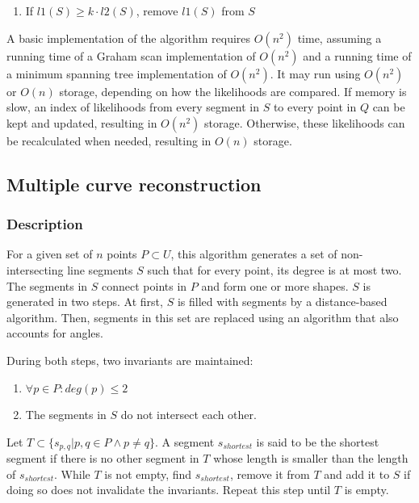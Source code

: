 \documentclass[11pt]{article}
\begin{document}
\begin{enumerate}
\item If $l1(S) \geq k \cdot l2(S)$, remove $l1(S)$ from $S$
\end{enumerate}

A basic implementation of the algorithm requires $O(n^2)$ time, assuming a running time of a Graham scan implementation of $O(n^2)$ and a running time of a minimum spanning tree implementation of $O(n^2)$. It may run using $O(n^2)$ or $O(n)$ storage, depending on how the likelihoods are compared. If memory is slow, an index of likelihoods from every segment in $S$ to every point in $Q$ can be kept and updated, resulting in $O(n^2)$ storage. Otherwise, these likelihoods can be recalculated when needed, resulting in $O(n)$ storage.

\subsection{Multiple curve reconstruction}
\subsubsection{Description}
For a given set of $n$ points $P \subset U$, this algorithm generates a set of non-intersecting line segments $S$ such that for every point, its degree is at most two.
The segments in $S$ connect points in $P$ and form one or more shapes.
$S$ is generated in two steps. At first, $S$ is filled with segments by a distance-based algorithm. Then, segments in this set are replaced using an algorithm that also accounts for angles.

During both steps, two invariants are maintained:%
\noindent\begin{enumerate}\topsep=0pt\itemsep=0pt\parsep=0pt
\item $\forall p \in P : deg(p) \leq 2$
\item The segments in $S$ do not intersect each other.
\end{enumerate}


Let $T \subset \{s_{p,q} | p,q \in P \land p \neq q \}$. A segment $s_{shortest}$ is said to be the shortest segment if there is no other segment in $T$ whose length is smaller than the length of $s_{shortest}$.
While $T$ is not empty, find $s_{shortest}$, remove it from $T$ and add it to $S$ if doing so does not invalidate the invariants. Repeat this step until $T$ is empty.
\end{document}
